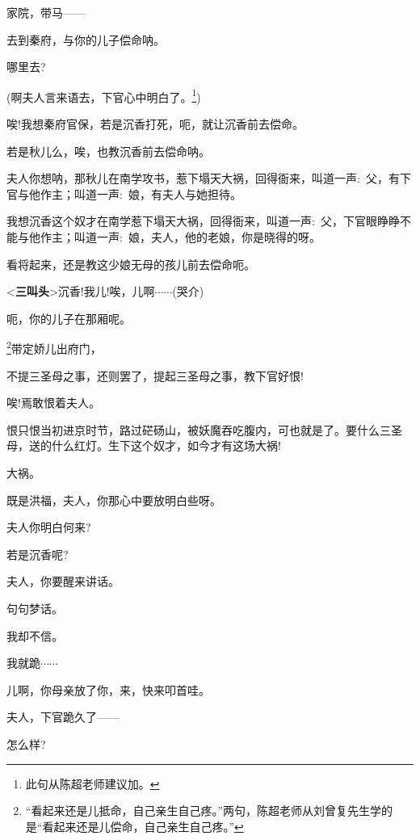 {家院，带马------}

{去到秦府，与你的儿子偿命{\footnotesize 呐}。}

{哪里去?}

{(啊夫人言来语去，下官心中明白了{。}\footnote{此句从陈超老师建议加。})}

{唉!我想秦府官保，若是沉香打死，呃，就让沉香前去偿命。}

{若是秋儿么，唉，也教沉香前去偿命呐。}

{夫人你想呐，那秋儿在南学攻书，惹下塌天大祸，回得衙来，叫道一声:~父，有下官与他作主；叫道一声:~娘，有夫人与她担待。}

{我想沉香这个奴才在南学惹下塌天大祸，回得衙来，叫道一声:~父，下官眼睁睁不能与他作主；叫道一声:~娘，夫人，他的老娘，你是晓得的呀。}

{看将起来，还是教这少娘无母的孩儿前去偿命{\footnotesize 呃}。}

{\textless{}{\!\bfseries\akai 三叫头}\!\textgreater{}沉香!我儿!唉，儿啊$\cdots{}\cdots{}$({\hwfs 哭介})}

{呃，你的儿子在那厢呢。}

\footnote{{``看起来还是儿抵命，自己亲生自己疼。''两句，}陈超老师从刘曾复先生学的是``{看起来还是儿偿命}，{自己亲生自己疼。}''}{带定娇儿出府门，}


{不提三圣母之事，还则罢了，提起三圣母之事，教下官好恨!}

{唉!焉敢恨着夫人。}

{恨只恨当初进京时节，路过硭砀山，被妖魔吞吃腹内，可也就是了。要什么三圣母，送的什么红灯。生下这个奴才，如今才有这场大祸!}

{大祸。}

{既是洪福，夫人，你那心中要放明白些呀。}

{夫人你明白何来?}

{若是沉香呢?}

{夫人，你要醒来讲话。}

{句句梦话。}

{我却不信。}

{我就跪$\cdots{}\cdots{}$}

{儿啊，你母亲放了你，来，快来叩首哇。}

{夫人，下官跪久了------}

{怎么样?}


